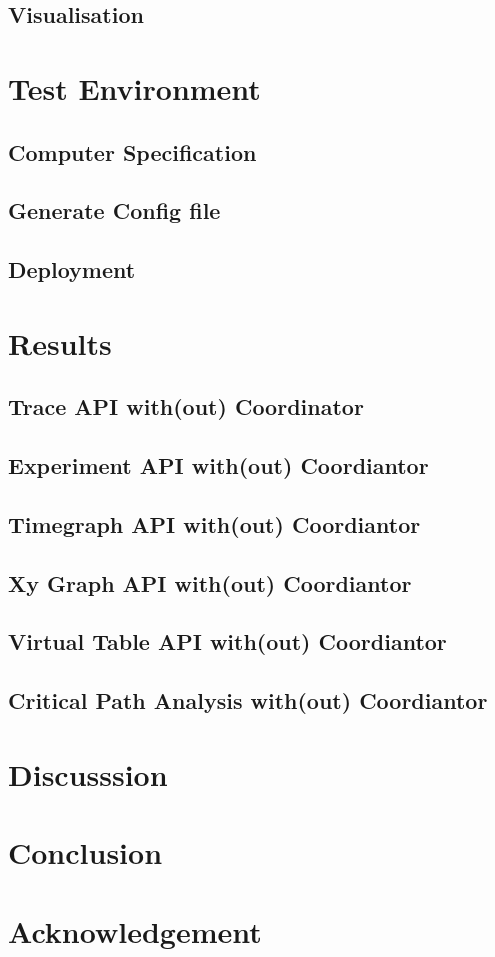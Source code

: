 \subsection{Visualisation}

\section{Test Environment}

\subsection{Computer Specification}

\subsection{Generate Config file}

\subsection{Deployment}

\section{Results}

\subsection{Trace API with(out) Coordinator}

\subsection{Experiment API with(out) Coordiantor}

\subsection{Timegraph API with(out) Coordiantor}

\subsection{Xy Graph API with(out) Coordiantor}

\subsection{Virtual Table API with(out) Coordiantor}

\subsection{Critical Path Analysis with(out) Coordiantor}

\section{Discusssion}

\section{Conclusion}

\section{Acknowledgement}